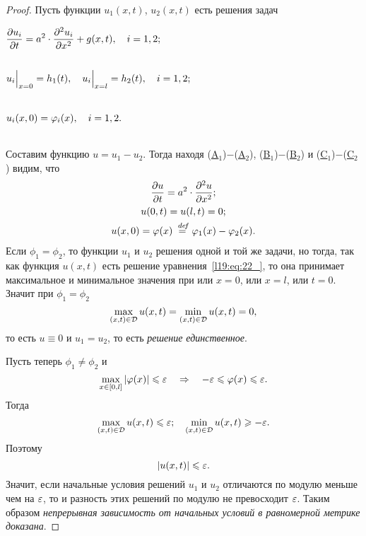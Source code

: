 \begin{proof}
	Пусть функции $u_1(x,t)$, $u_2(x,t)$ есть решения задач
	\begin{enumerateAi}
		\item\label{l19:eq:Ai} $\displaystyle \pder{u_i}{t}=a^2\cdot\pdder{u_i}{x}+g(x,t),\quad i=1,2;\vphantom{\int\limits_{a}}$
		\item\label{l19:eq:Bi} $\displaystyle u_i\Big|_{x=0}=h_1(t),\quad u_i\Big|_{x=l}=h_2(t),\quad i=1,2;\vphantom{\int\limits_{a}}$ 
		\item\label{l19:eq:Ci} $\displaystyle u_i(x,0)=\phi_i(x),\quad i=1,2.\vphantom{\int\limits_{a}}$
	\end{enumerateAi}
	
	Составим функцию $u=u_1-u_2$. Тогда находя (\hyperref[l19:eq:Ai]{A$_1$})$-$(\hyperref[l19:eq:Ai]{A$_2$}), (\hyperref[l19:eq:Bi]{B$_1$})$-$(\hyperref[l19:eq:Bi]{B$_2$}) и (\hyperref[l19:eq:Ci]{C$_1$})$-$(\hyperref[l19:eq:Ci]{C$_2$}) видим, что
	\begin{gather}
		\frac{\partial u}{\partial t}=a^2\cdot\frac{\partial^2u}{\partial x^2};\nonumber\\ 
		u(0,t)=u(l,t)=0;\label{l19:eq:22_}\\ 
		u(x,0)=\varphi(x)\stackrel{\hspace{0.09 cm}de\!f}{=}\varphi_1(x)-\varphi_2(x).\nonumber
	\end{gather}
	Если $\phi_1=\phi_2$, то функции $u_1$ и $u_2$ решения одной и той же задачи, но тогда, так как функция $u(x,t)$ есть решение уравнения~\eqref{l19:eq:22_}, то она принимает максимальное и минимальное значения при или $x=0$, или $x=l$, или $t=0$. Значит при $\phi_1=\phi_2$
	\begin{equation*}
		\max\limits_{(x,t)\in\mathcal{D}}u(x,t)=\min\limits_{(x,t)\in\mathcal{D}}u(x,t)=0,
	\end{equation*}
	то есть $u\equiv0$ и $u_1=u_2$, то есть \emph{решение единственное}.
	
	Пусть теперь $\phi_1\neq\phi_2$ и 
	\begin{equation*}
		\max\limits_{x\in[0,l]}|\varphi(x)|\leqslant\varepsilon\quad\Rightarrow\quad-\varepsilon\leqslant\varphi(x)\leqslant\varepsilon.
	\end{equation*}
	Тогда 
	\begin{equation*}
		\max\limits_{(x,t)\in\mathcal{D}}u(x,t)\leqslant\varepsilon;\quad\min\limits_{(x,t)\in\mathcal{D}}u(x,t)\geqslant-\varepsilon.
	\end{equation*}
	Поэтому
	\begin{equation*}
		|u(x,t)|\leqslant\varepsilon.
	\end{equation*}
	Значит, если начальные условия решений $u_1$ и $u_2$ отличаются по модулю   меньше чем на $\varepsilon$, то и разность этих решений по модулю не превосходит $\varepsilon$. Таким образом \emph{непрерывная зависимость от начальных условий в равномерной метрике доказана}.
\end{proof}

